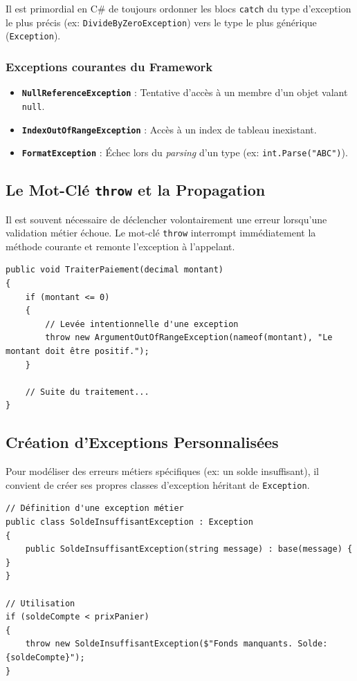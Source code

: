 Il est primordial en C\# de toujours ordonner les blocs \texttt{catch} du type d'exception le plus précis (ex: \texttt{DivideByZeroException}) vers le type le plus générique (\texttt{Exception}).

\subsubsection{Exceptions courantes du Framework}
\begin{itemize}
    \item \textbf{\texttt{NullReferenceException}} : Tentative d'accès à un membre d'un objet valant \texttt{null}.
    \item \textbf{\texttt{IndexOutOfRangeException}} : Accès à un index de tableau inexistant.
    \item \textbf{\texttt{FormatException}} : Échec lors du \textit{parsing} d'un type (ex: \texttt{int.Parse("ABC")}).
\end{itemize}

\subsection{Le Mot-Clé \texttt{throw} et la Propagation}

Il est souvent nécessaire de déclencher volontairement une erreur lorsqu'une validation métier échoue. Le mot-clé \texttt{throw} interrompt immédiatement la méthode courante et remonte l'exception à l'appelant.

\begin{lstlisting}[style=csharpstyle]
public void TraiterPaiement(decimal montant)
{
    if (montant <= 0)
    {
        // Levée intentionnelle d'une exception
        throw new ArgumentOutOfRangeException(nameof(montant), "Le montant doit être positif.");
    }
    
    // Suite du traitement...
}
\end{lstlisting}

\subsection{Création d'Exceptions Personnalisées}

Pour modéliser des erreurs métiers spécifiques (ex: un solde insuffisant), il convient de créer ses propres classes d'exception héritant de \texttt{Exception}.

\begin{lstlisting}[style=csharpstyle]
// Définition d'une exception métier
public class SoldeInsuffisantException : Exception
{
    public SoldeInsuffisantException(string message) : base(message) { }
}

// Utilisation
if (soldeCompte < prixPanier)
{
    throw new SoldeInsuffisantException($"Fonds manquants. Solde: {soldeCompte}");
}
\end{lstlisting}

